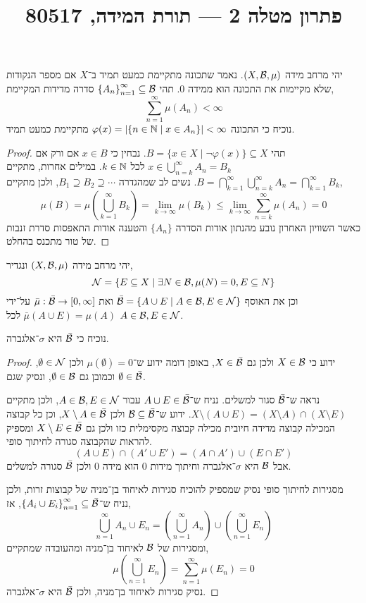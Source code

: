
\title{פתרון מטלה 2 --- תורת המידה, 80517}


\maketitle
\maketitleprint[blue]

\question{}
יהי מרחב מידה $(X, \mathcal{B}, \mu)$.
נאמר שתכונה מתקיימת כמעט תמיד ב־$X$ אם מספר הנקודות שלא מקיימות את התכונה הוא ממידה 0.
תהי ${\{ A_n \}}_{n = 1}^{\infty} \subseteq \mathcal{B}$ סדרה מדידות המקיימת,
\[
	\sum_{n = 1}^\infty \mu(A_n) < \infty
\]
נוכיח כי התכונה $\varphi(x) = |\{ n \in \mathbb{N} \mid x \in A_n \}| < \infty$ מתקיימת כמעט תמיד.
\begin{proof}
	תהי $B = \{ x \in X \mid \lnot \varphi(x) \} \subseteq X$.
	נבחין כי $x \in B$ אם ורק אם $x \in \bigcup_{n = k}^\infty A_n = B_k$ לכל $k \in \mathbb{N}$.
	במילים אחרות, מתקיים $B = \bigcap_{k = 1}^\infty \bigcup_{n = k}^\infty A_n = \bigcap_{k = 1}^\infty B_k$.
	נשים לב שמהגדרה $B_1 \supseteq B_2 \supseteq \cdots$, ולכן מתקיים,
	\[
		\mu(B)
		= \mu(\bigcup_{k = 1}^\infty B_k)
		= \lim_{k \to \infty} \mu(B_k)
		\le \lim_{k \to \infty} \sum_{n = k}^\infty \mu(A_n)
		= 0
	\]
	כאשר השוויון האחרון נובע מהנתון אודות הסדרה $\{ A_n \}$ והטענה אודות התאפסות סדרת זנבות של טור מתכנס בהחלט.
\end{proof}

\question{}
יהי מרחב מידה $(X, \mathcal{B}, \mu)$ ונגדיר,
\[
	\mathcal{N} = \{ E \subseteq X \mid \exists N \in \mathcal{B}, \mu(N) = 0, E \subseteq N \}
\]
וכן את האוסף $\bar{\mathcal{B}} = \{ A \cup E \mid A \in \mathcal{B}, E \in \mathcal{N} \}$ ואת $\bar{\mu} : \bar{\mathcal{B}} \to [0, \infty]$ על־ידי $\bar{\mu}(A \cup E) = \mu(A)$ לכל $A \in \mathcal{B}, E \in \mathcal{N}$.

\subquestion{}
נוכיח כי $\bar{\mathcal{B}}$ היא $\sigma$־אלגברה.
\begin{proof}
	ידוע כי $X \in \mathcal{B}$ ולכן גם $X \in \bar{\mathcal{B}}$, באופן דומה ידוע ש־$\mu(\emptyset) = 0$ ולכן $\emptyset \in \mathcal{N}$, וכמובן גם $\emptyset \in \mathcal{B}$, ונסיק שגם $\emptyset \in \bar{\mathcal{B}}$.

	נראה ש־$\bar{\mathcal{B}}$ סגור למשלים.
	נניח ש־$A \cup E \in \bar{\mathcal{B}}$ עבור $A \in \mathcal{B}, E \in \mathcal{N}$, ולכן מתקיים $X \setminus (A \cup E) = (X \setminus A) \cap (X \setminus E)$.
	ידוע ש־$\mathcal{B} \subseteq \bar{\mathcal{B}}$ ולכן $X \setminus A \in \bar{\mathcal{B}}$, וכן כל קבוצה המכילה קבוצה מדידה חיובית מכילה קבוצה מקסימלית כזו ולכן גם $X \setminus E \in \bar{\mathcal{B}}$ ומספיק להראות שהקבוצה סגורה לחיתוך סופי.
	\[
		(A \cup E) \cap (A' \cup E')
		= (A \cap A') \cup (E \cap E')
	\]
	אבל $\mathcal{B}$ היא $\sigma$־אלגברה וחיתוך מידות 0 הוא מידה 0 ולכן $\bar{\mathcal{B}}$ סגורה למשלים.

	מסגירות לחיתוך סופי נסיק שמספיק להוכיח סגירות לאיחוד בן־מניה של קבוצות זרות, ולכן נניח ש־${\{ A_i \cup E_i \}}_{n = 1}^\infty \subseteq \bar{\mathcal{B}}$, אז,
	\[
		\bigcup_{n = 1}^\infty A_n \cup E_n
		= (\bigcup_{n = 1}^\infty A_n) \cup (\bigcup_{n = 1}^\infty E_n)
	\]
	ומסגירות של $\mathcal{B}$ לאיחוד בן־מניה ומהעובדה שמתקיים,
	\[
		\mu(\bigcup_{n = 1}^\infty E_n)
		= \sum_{n = 1}^\infty \mu(E_n)
		= 0
	\]
	נסיק סגירות לאיחוד בן־מניה, ולכן $\bar{\mathcal{B}}$ היא $\sigma$־אלגברה.
\end{proof}

